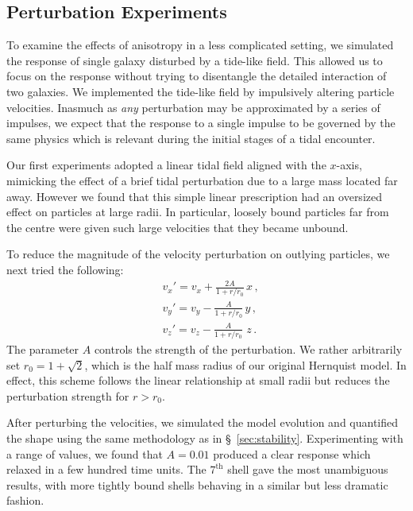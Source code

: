 \documentclass[fleqn,usenatbib]{mnras}
\begin{document}
\subsection{Perturbation Experiments}
\label{sec:perturbation_experiments}

To examine the effects of anisotropy in a less complicated setting, we simulated the response of single galaxy disturbed by a tide-like field. This allowed us to focus on the response without trying to disentangle the detailed interaction of two galaxies. We implemented the tide-like field by impulsively altering particle velocities. Inasmuch as \textit{any} perturbation may be approximated by a series of impulses, we expect that the response to a single impulse to be governed by the same physics which is relevant during the initial stages of a tidal encounter.

 Our first experiments adopted a linear tidal field aligned with the $x$-axis, mimicking the effect of a brief tidal perturbation due to a large mass located far away. However we found that this simple linear prescription had an oversized effect on particles at large radii. In particular, loosely bound particles far from the centre were given such large velocities that they became unbound.

To reduce the magnitude of the velocity perturbation on outlying particles, we next tried the following:
\begin{subequations}
\label{eq:perturbation}
\begin{align}
    &v_x'= v_x + \frac{2 A}{1+r/r_\mathrm{0}} \, x \, , \\
    &v_y'= v_y - \frac{A}{1+r/r_\mathrm{0}} \, y \, ,\\
    &v_z'= v_z - \frac{A}{1+r/r_\mathrm{0}} \, \, z \, .
\end{align}
\end{subequations}
The parameter $A$ controls the strength of the perturbation. We rather arbitrarily set $r_\mathrm{0}=1+\sqrt{2}$, which is the half mass radius of our original Hernquist model. In effect, this scheme follows the linear relationship at small radii but reduces the perturbation strength for $r > r_\mathrm{0}$. 

After perturbing the velocities, we simulated the model evolution and quantified the shape using the same methodology as in \S~\ref{sec:stability}. Experimenting with a range of values, we found that $A = 0.01$ produced a clear response which relaxed in a few hundred time units. The $7^\mathrm{th}$ shell gave the most unambiguous results, with more tightly bound shells behaving in a similar but less dramatic fashion.
\end{document}

